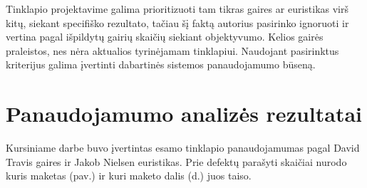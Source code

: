 \documentclass{VUMIFPSbakalaurinis}
\begin{document}
Tinklapio projektavime galima prioritizuoti tam tikras gaires ar euristikas virš kitų, siekant specifiško rezultato, tačiau šį faktą autorius pasirinko ignoruoti ir vertina pagal išpildytų gairių skaičių siekiant objektyvumo. Kelios gairės praleistos, nes nėra aktualios tyrinėjamam tinklapiui. Naudojant pasirinktus kriterijus galima įvertinti dabartinės sistemos panaudojamumo būseną.

\section{Panaudojamumo analizės rezultatai}
Kursiniame darbe buvo įvertintas esamo tinklapio panaudojamumas pagal David Travis gaires\cite{SearchGuidelinesEn}\cite{NavigationAndIAGuidelinesEn} ir Jakob Nielsen euristikas\cite{NielsenHeuristicsEn}. Prie defektų parašyti skaičiai nurodo kuris maketas (pav.) ir kuri maketo dalis (d.) juos taiso.
\end{document}
